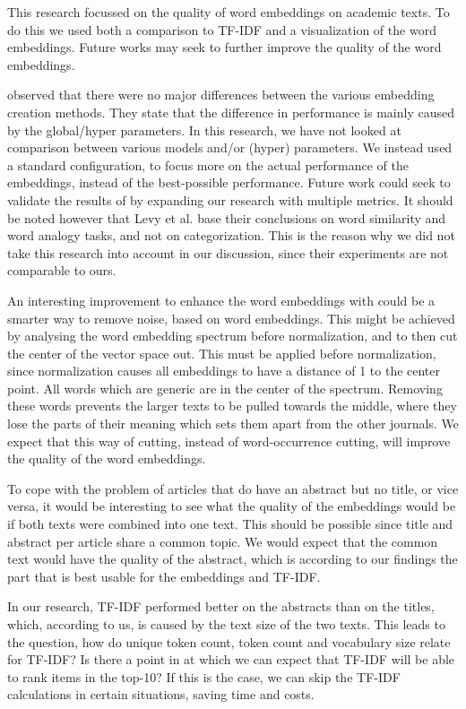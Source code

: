 \documentclass[../../Thesis.tex]{subfiles}
\begin{document}
This research focussed on the quality of word embeddings on academic texts. To do this we used both a comparison to TF-IDF and a visualization of the word embeddings. Future works may seek to further improve the quality of the word embeddings. 

\citet{levy2015improving} observed that there were no major differences between the various embedding creation methods. They state that the difference in performance is mainly caused by the global/hyper parameters. In this research, we have not looked at comparison between various models and/or (hyper) parameters. We instead used a standard configuration, to focus more on the actual performance of the embeddings, instead of the best-possible performance. Future work could seek to validate the results of \citet{levy2015improving} by expanding our research with multiple metrics. It should be noted however that Levy et al. base their conclusions on word similarity and word analogy tasks, and not on categorization. This is the reason why we did not take this research into account in our discussion, since their experiments are not comparable to ours.

An interesting improvement to enhance the word embeddings with could be a smarter way to remove noise, based on word embeddings. This might be achieved by analysing the word embedding spectrum before normalization, and to then cut the center of the vector space out. This must be applied before normalization, since normalization causes all embeddings to have a distance of 1 to the center point. All words which are generic are in the center of the spectrum. Removing these words prevents the larger texts to be pulled towards the middle, where they lose the parts of their meaning which sets them apart from the other journals. We expect that this way of cutting, instead of word-occurrence cutting, will improve the quality of the word embeddings.

To cope with the problem of articles that do have an abstract but no title, or vice versa, it would be interesting to see what the quality of the embeddings would be if both texts were combined into one text. This should be possible since title and abstract per article share a common topic. We would expect that the common text would have the quality of the abstract, which is according to our findings the part that is best usable for the embeddings and TF-IDF.

In our research, TF-IDF performed better on the abstracts than on the titles, which, according to us, is caused by the text size of the two texts. This leads to the question, how do unique token count, token count and vocabulary size relate for TF-IDF? Is there a point in at which we can expect that TF-IDF will be able to rank items in the top-10? If this is the case, we can skip the TF-IDF calculations in certain situations, saving time and costs.
\end{document}
